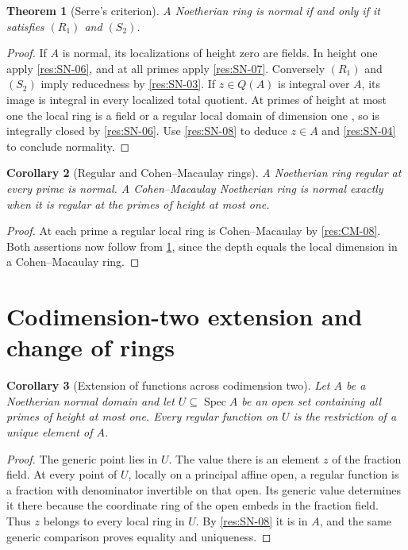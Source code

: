 \documentclass[11pt,oneside,openany]{book}
\newtheorem{theorem}{Theorem}[chapter]
\newtheorem{corollary}[theorem]{Corollary}
\theoremstyle{definition}
\theoremstyle{remark}
\begin{document}
\begin{theorem}[Serre's criterion]\label{res:SN-09}
A Noetherian ring is normal if and only if it satisfies
$(R_1)$ and $(S_2)$.
\end{theorem}
\begin{proof}
If $A$ is normal, its localizations of height zero are fields.
In height one apply \ref{res:SN-06}, and at all primes apply
\ref{res:SN-07}. Conversely $(R_1)$ and $(S_2)$ imply
reducedness by \ref{res:SN-03}. If $z\in Q(A)$ is integral
over $A$, its image is integral in every localized total
quotient. At primes of height at most one the local ring
is a field or a regular local domain of dimension one
\cite[ALG-05-C03-S03]{p103}, so is integrally closed by
\ref{res:SN-06}. Use \ref{res:SN-08} to deduce $z\in A$ and
\ref{res:SN-04} to conclude normality.
\end{proof}

\begin{corollary}[Regular and Cohen--Macaulay rings]\label{res:SN-10}
A Noetherian ring regular at every prime is normal. A
Cohen--Macaulay Noetherian ring is normal exactly when it is
regular at the primes of height at most one.
\end{corollary}
\begin{proof}
At each prime a regular local ring is Cohen--Macaulay by
\ref{res:CM-08}. Both assertions now follow from
\ref{res:SN-09}, since the depth equals the local dimension
in a Cohen--Macaulay ring.
\end{proof}

\section{Codimension-two extension and change of rings}

\begin{corollary}[Extension of functions across codimension two]\label{res:SN-11}
Let $A$ be a Noetherian normal domain and let
$U\subseteq\operatorname{Spec}A$ be an open set containing all
primes of height at most one. Every regular function on $U$
is the restriction of a unique element of $A$.
\end{corollary}
\begin{proof}
The generic point lies in $U$. The value there is an element
$z$ of the fraction field. At every point of $U$, locally on
a principal affine open, a regular function is a fraction
with denominator invertible on that open. Its generic value
determines it there because the coordinate ring of the open
embeds in the fraction field. Thus $z$ belongs to every local
ring in $U$. By \ref{res:SN-08} it is in $A$, and the same
generic comparison proves equality and uniqueness.
\end{proof}
\end{document}
